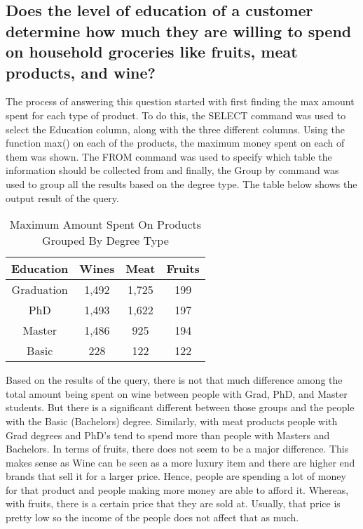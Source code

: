 \documentclass{article}
\begin{document}
\subsection{Does the level of education of a customer determine how much they are willing to spend on household groceries like fruits, meat products, and wine?}

The process of answering this question started with first finding the max amount spent for each type of product. To do this, the SELECT command  was used to select the Education column, along with the three different columns. Using the function max() on each of the products, the maximum money spent on each of them was shown. The FROM command was used to specify which table the information should be collected from and finally, the Group by command was used to group all the results based on the degree type. The table below shows the output result of the query. 

\begin{table}[h]
	\centering
	\caption{Maximum Amount Spent On Products Grouped By Degree Type}
	\label{table2}
	\begin{tabular}{@{}cccc@{}}
		\toprule
		\textbf{Education}& \textbf{Wines }& \textbf{Meat }& \textbf{Fruits} \\
		\midrule
		Graduation & 1,492 & 1,725 & 199 \\
  	  PhD & 1,493 & 1,622 & 197 \\
		Master & 1,486 & 925 & 194  \\
		Basic & 228 & 122 & 122  \\
	
		\bottomrule
	\end{tabular}
\end{table}

Based on the results of the query, there is not that much difference among the total amount being spent on wine between people with Grad, PhD, and Master students. But there is a significant different between those groups and the people with the Basic (Bachelors) degree. Similarly, with meat products people with Grad degrees and PhD's tend to spend more than people with Masters and Bachelors. In terms of fruits, there does not seem to be a major difference. This makes sense as Wine can be seen as a more luxury item and there are higher end brands that sell it for a larger price. Hence, people are spending a lot of money for that product and people making more money are able to afford it. Whereas, with fruits, there is a certain price that they are sold at. Usually, that price is pretty low so the income of the people does not affect that as much. 
\end{document}
